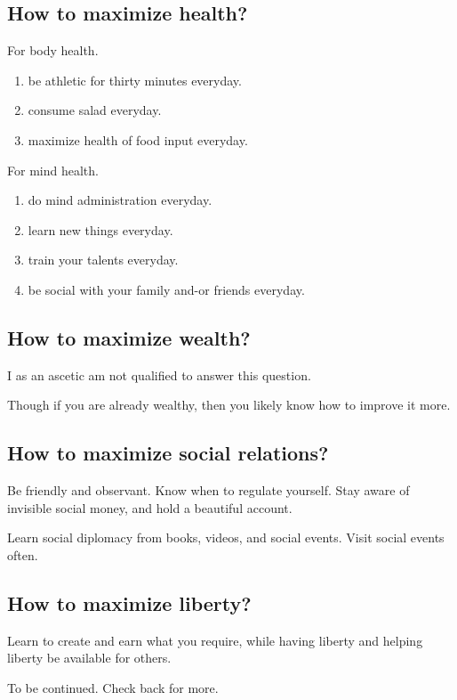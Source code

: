 \documentclass{report}
\begin{document}
\subsection{How to maximize health?}

For body health.
\begin{enumerate}
  \item be athletic for thirty minutes everyday.
  \item consume salad everyday.
  \item maximize health of food input everyday.
\end{enumerate}

For mind health.
\begin{enumerate}
  \item do mind administration everyday.
  \item learn new things everyday.
  \item train your talents everyday.
  \item be social with your family and-or friends everyday.
\end{enumerate}

\subsection{How to maximize wealth?}

I as an ascetic am not qualified to answer this question. 

Though if you are already wealthy, 
then you likely know how to improve it more.

\subsection{How to maximize social relations?}

Be friendly and observant.
Know when to regulate yourself.
Stay aware of invisible social money, 
and hold a beautiful account.

Learn social diplomacy from books, videos, and social events.
Visit social events often.

\subsection{How to maximize liberty?}

Learn to create and earn what you require,
while having liberty and helping liberty be available for others.

To be continued.
Check back for more.
\end{document}
